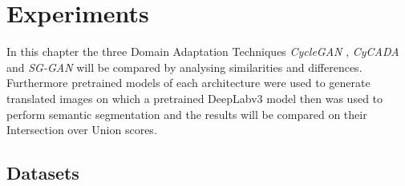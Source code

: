 \chapter{Experiments}
\label{sec:experiments}

In this chapter the three Domain Adaptation Techniques \textit{CycleGAN} \cite{DBLP:journals/corr/ZhuPIE17}, \textit{CyCADA} \cite{DBLP:journals/corr/abs-1711-03213} and \textit{SG-GAN} \cite{DBLP:journals/corr/abs-1801-01726} will be compared by analysing similarities and differences. Furthermore pretrained models of each architecture were used to generate translated images on which a pretrained DeepLabv3 \cite{DBLP:journals/corr/ChenPSA17} model then was used to perform semantic segmentation and the results will be compared on their Intersection over Union scores.


\section{Datasets}

